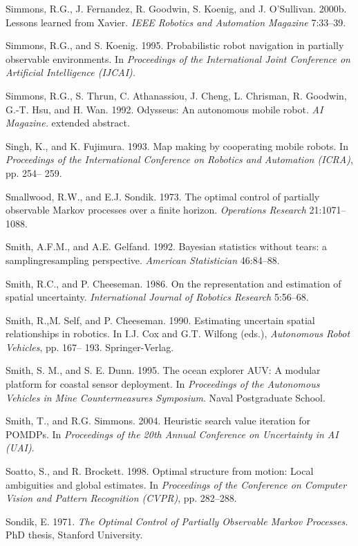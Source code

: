 \documentclass[10pt,a4paper]{article}
\begin{document}
Simmons, R.G., J. Fernandez, R. Goodwin, S. Koenig, and J. O’Sullivan. 2000b.
Lessons learned from Xavier. \textit{IEEE Robotics and Automation Magazine} 7:33–39.

Simmons, R.G., and S. Koenig. 1995. Probabilistic robot navigation in partially observable
environments. In \textit{Proceedings of the International Joint Conference on Artificial
Intelligence (IJCAI).}

Simmons, R.G., S. Thrun, C. Athanassiou, J. Cheng, L. Chrisman, R. Goodwin, G.-T.
Hsu, and H. Wan. 1992. Odysseus: An autonomous mobile robot. \textit{AI Magazine.}
extended abstract.

Singh, K., and K. Fujimura. 1993. Map making by cooperating mobile robots. In
\textit{Proceedings of the International Conference on Robotics and Automation (ICRA)}, pp. 254–
259.

Smallwood, R.W., and E.J. Sondik. 1973. The optimal control of partially observable
Markov processes over a finite horizon. \textit{Operations Research} 21:1071–1088.

Smith, A.F.M., and A.E. Gelfand. 1992. Bayesian statistics without tears: a samplingresampling
perspective. \textit{American Statistician} 46:84–88.

Smith, R.C., and P. Cheeseman. 1986. On the representation and estimation of spatial
uncertainty. \textit{International Journal of Robotics Research} 5:56–68.

Smith, R.,M.
Self, and P. Cheeseman. 1990. Estimating uncertain spatial relationships
in robotics. In I.J. Cox and G.T. Wilfong (eds.), \textit{Autonomous Robot Vehicles}, pp. 167–
193. Springer-Verlag.

Smith, S. M., and S. E. Dunn. 1995. The ocean explorer AUV: A modular platform
for coastal sensor deployment. In \textit{Proceedings of the Autonomous Vehicles in Mine
Countermeasures Symposium}. Naval Postgraduate School.

Smith, T., and R.G. Simmons. 2004. Heuristic search value iteration for POMDPs. In
\textit{Proceedings of the 20th Annual Conference on Uncertainty in AI (UAI)}.

Soatto, S., and R. Brockett. 1998. Optimal structure from motion: Local ambiguities
and global estimates. In \textit{Proceedings of the Conference on Computer Vision and Pattern
Recognition (CVPR)}, pp. 282–288.

Sondik, E. 1971. \textit{The Optimal Control of Partially Observable Markov Processes.} PhD
thesis, Stanford University.
\end{document}
